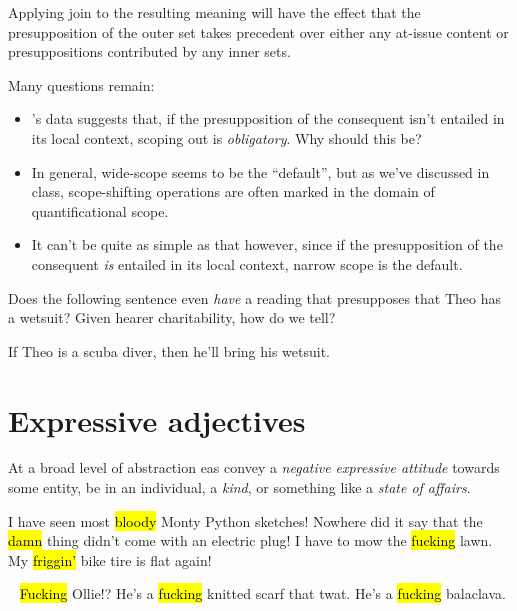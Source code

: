 \documentclass[nols,twoside,nofonts,nobib,nohyper]{tufte-handout}
\begin{document}
Applying join to the resulting meaning will have the effect that the presupposition of the outer set takes precedent over either any at-issue content or presuppositions contributed by any inner sets.

Many questions remain:

\begin{itemize}

  \item \citeauthor{mandelkern2016}'s data suggests that, if the presupposition of the consequent isn't entailed in its local context, scoping out is \textit{obligatory}. Why should this be?

  \item In general, wide-scope seems to be the \enquote{default}, but as we've discussed in class, scope-shifting operations are often marked in the domain of quantificational scope.

  \item It can't be quite as simple as that however, since if the presupposition of the consequent \textit{is} entailed in its local context, narrow scope is the default.

\end{itemize}

Does the following sentence even \textit{have} a reading that presupposes that Theo has a wetsuit? Given hearer charitability, how do we tell?

\ex
If Theo is a scuba diver, then he'll bring his wetsuit.
\xe

\section{Expressive adjectives}

At a broad level of abstraction \acp{ea} convey a \textit{negative expressive attitude} towards some entity, be in an individual, a \textit{kind}, or something like a \textit{state of affairs}.

\pex
\a I have seen most \hl{bloody} Monty Python sketches!
\a Nowhere did it say that the \hl{damn} thing didn't come with an electric plug!
\a I have to mow the \hl{fucking} lawn.
\a My \hl{friggin'} bike tire is flat again!
\xe

\ex~
\hl{Fucking} Ollie!? He's a \hl{fucking} knitted scarf that twat. He's a \hl{fucking} balaclava.
\xe
\end{document}
